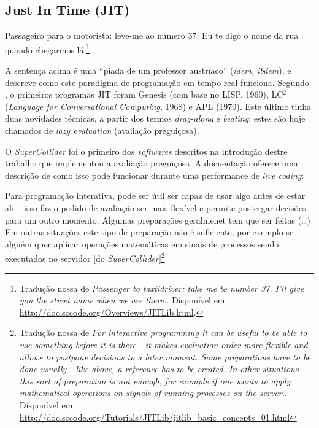 \subsection{Just In Time (JIT)}\label{sec:jit}

\begin{citacao}
Passageiro para o motorista: leve-me ao número 37. Eu te digo o nome da rua quando chegarmos lá.\footnote{Tradução nossa de \emph{Passenger to taxtidriver: take me to number 37. I'll give you the street name when we are there.}. Disponível em \url{http://doc.sccode.org/Overviews/JITLib.html}.}
\end{citacao}

A sentença acima é uma ``piada de um professor austríaco'' (\emph{idem, ibdem}), e descreve como este paradigma de programação em tempo-real funciona. Segundo , o primeiros programas JIT foram Genesis (com base no LISP, 1960), LC$^2$ (\emph{Language for Conversational Computing}, 1968) e APL (1970). Este último tinha duas novidades técnicas, a partir dos termos \emph{drag-along} e \emph{beating}; estes são hoje chamados de \emph{lazy evaluation} (avaliação preguiçosa). 

O \emph{SuperCollider} foi o primeiro dos \emph{softwares} descritos na introdução destre trabalho que implementou a avaliação preguiçosa.
A docuentação oferece uma descrição de como isso pode funcionar durante uma performance de \emph{live coding}:

\begin{citacao}
Para programação interativa, pode ser útil ser capaz de usar algo antes de estar ali -- isso faz o pedido de avaliação ser mais flexível e permite postergar decisões para um outro momento. Algumas preparações geralmenet tem que ser feitas (\ldots) Em outras situações este tipo de preparação não é suficiente, por exemplo se alguém quer aplicar operações matemáticas em sinais de processos sendo executados no servidor $[$do \emph{SuperCollider}$]$\footnote{Tradução nossa de \emph{For interactive programming it can be useful to be able to use something before it is there - it makes evaluation order more flexible and allows to postpone decisions to a later moment. Some preparations have to be done usually - like above, a reference has to be created. In other situations this sort of preparation is not enough, for example if one wants to apply mathematical operations on signals of running processes on the server.}. Disponível em \url{http://doc.sccode.org/Tutorials/JITLib/jitlib_basic_concepts_01.html}}
\end{citacao}

